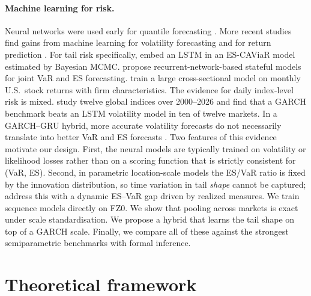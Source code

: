\documentclass[11pt]{article}
\theoremstyle{remark}
\newcommand{\1}{\mathbf{1}}
\begin{document}
\paragraph{Machine learning for risk.} Neural networks were used early for quantile forecasting \citep{taylor2000quantile}. More recent studies find gains from machine learning for volatility forecasting \citep{bucci2020realized,christensen2023machine} and for return prediction \citep{gu2020empirical}. For tail risk specifically, \citet{li2021bayesian} embed an LSTM in an ES-CAViaR model estimated by Bayesian MCMC. \citet{stateful2024rnn} propose recurrent-network-based stateful models for joint VaR and ES forecasting. \citet{zhang2026resga} train a large cross-sectional model on monthly U.S.\ stock returns with firm characteristics. The evidence for daily index-level risk is mixed. \citet{amjad2026neural} study twelve global indices over 2000--2026 and find that a GARCH benchmark beats an LSTM volatility model in ten of twelve markets. In a GARCH--GRU hybrid, more accurate volatility forecasts do not necessarily translate into better VaR and ES forecasts \citep{garchgru2023}. Two features of this evidence motivate our design. First, the neural models are typically trained on volatility or likelihood losses rather than on a scoring function that is strictly consistent for (VaR, ES). Second, in parametric location-scale models the ES/VaR ratio is fixed by the innovation distribution, so time variation in tail \emph{shape} cannot be captured; \citet{dfsm2026} address this with a dynamic ES--VaR gap driven by realized measures. We train sequence models \citep{hochreiter1997long,vaswani2017attention} directly on FZ0. We show that pooling across markets is exact under scale standardisation. We propose a hybrid that learns the tail shape on top of a GARCH scale. Finally, we compare all of these against the strongest semiparametric benchmarks with formal inference.

\section{Theoretical framework}\label{sec:theory}
\end{document}
